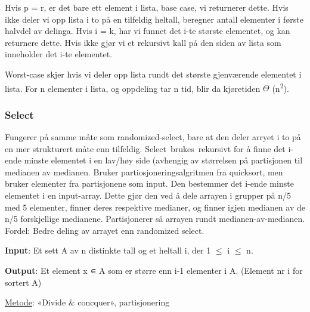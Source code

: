 \documentclass[12pt]{report}
\begin{document}
\vspace{\baselineskip}
Hvis p = r, er det bare ett element i lista, base case, vi returnerer dette. Hvis ikke deler vi opp lista i to på en tilfeldig heltall, beregner antall elementer i første halvdel av delinga. Hvis i = k, har vi funnet det i-te største elementet, og kan returnere dette. Hvis ikke gjør vi et rekursivt kall på den siden av lista som inneholder det i-te elementet. \par


\vspace{\baselineskip}
Worst-case skjer hvis vi deler opp lista rundt det største gjenværende elementet i lista. For n elementer i lista, og oppdeling tar n tid, blir da kjøretiden $ \Theta $ (n\textsuperscript{2}).\par


\vspace{\baselineskip}

\vspace{\baselineskip}

\vspace{\baselineskip}\subsubsection*{Select}
Fungerer på samme måte som randomized-select, bare at den deler arryet i to på en mer strukturert måte enn tilfeldig. Select\ brukes\ rekursivt for å finne det i-ende minste elementet i en lav/høy side (avhengig av størrelsen på partisjonen til medianen av medianen. Bruker partiosjoneringsalgritmen fra quicksort,  men bruker elementer fra partisjonene som input. Den bestemmer det i-ende minste elementet i  en input-array. Dette gjør den ved å dele arrayen i grupper på n/5 med 5 elementer, finner deres respektive medianer, og finner igjen medianen av de n/5 forskjellige medianene. Partisjonerer så arrayen rundt medianen-av-medianen. Fordel: Bedre deling av arrayet enn randomized select.\par

\textbf{Input}: Et sett A av n distinkte tall og et heltall i, der 1 $ \leq $  i $ \leq $  n.\par

\textbf{Output}: Et element x ∊ A som er større enn i-1 elementer i A. (Element nr i for sortert A)\par


\vspace{\baselineskip}
\uline{Metode}: «Divide $\&$  concquer», partisjonering\par
\end{document}
